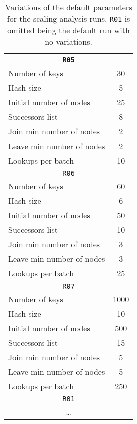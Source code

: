 \documentclass[11pt,twocolumn,letterpaper]{article}
\begin{document}
	\begin{table}[h!]
		\caption{Variations of the default parameters for the scaling analysis runs. \texttt{R01} is omitted being the default run with no variations.}
		\label{tab:netsize_runs}
		\centering
		\begin{tabular}{lc}
			\hline
		    \multicolumn{2}{c}{\texttt{R05}}\\
			\hline
			Number of keys & 30\\
			\hline
			Hash size & 5\\
			\hline
			Initial number of nodes & 25\\
			\hline
			Successors list & 8\\
			\hline
			Join min number of nodes & 2\\
			\hline
			Leave min number of nodes & 2\\
			\hline
			Lookups per batch & 10\\
			\hline
			\hline
		    
		    \multicolumn{2}{c}{\texttt{R06}}\\
			\hline
			Number of keys & 60\\
			\hline
			Hash size & 6\\
			\hline
			Initial number of nodes & 50\\
			\hline
			Successors list & 10\\
			\hline
			Join min number of nodes & 3\\
			\hline
			Leave min number of nodes & 3\\
			\hline
			Lookups per batch & 25\\
			\hline
			\hline

			\multicolumn{2}{c}{\texttt{R07}}\\
			\hline
			Number of keys & 1000\\
			\hline
			Hash size & 10\\
			\hline
			Initial number of nodes & 500\\
			\hline
			Successors list & 15\\
			\hline
			Join min number of nodes & 5\\
			\hline
			Leave min number of nodes & 5\\
			\hline
			Lookups per batch & 250\\
			\hline
			\hline
			
			\multicolumn{2}{c}{\texttt{R01}}\\
			\hline
			\multicolumn{2}{c}{\dots}\\
			\hline
		\end{tabular}
	\end{table}		
	
\end{document}
